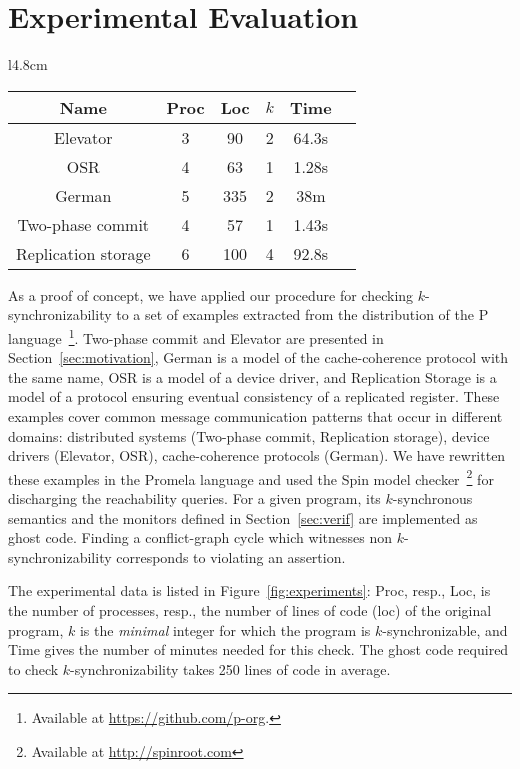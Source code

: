 \section{Experimental Evaluation}

\begin{wrapfigure}{l}{4.8cm}
\vspace{-7mm}
{\scriptsize
\begin{tabular}{|c|c|c|c|c|c|}
\hline
Name & Proc & Loc  & $k$ & Time \\
\hline
Elevator& 3 & 90  & 2 & 64.3s  \\
\hline
OSR & 4 & 63  & 1 & 1.28s \\
\hline
German & 5 & 335 & 2 & 38m \\
\hline
Two-phase commit &4 & 57 & 1 & 1.43s  \\
\hline
Replication storage & 6 & 100  & 4 & 92.8s \\
\hline
\end{tabular}
}
\caption{Experimental results.}
\label{fig:experiments}
\vspace{-7mm}
\end{wrapfigure}
As a proof of concept, we have applied our procedure for checking $k$-synchronizability to a set of examples extracted from the distribution of the P language~\footnote{Available at \url{https://github.com/p-org}.}. Two-phase commit and Elevator are presented in Section~\ref{sec:motivation}, German is a model of the cache-coherence protocol with the same name, OSR is a model of a device driver, and Replication Storage is a model of a protocol ensuring eventual consistency of a replicated register.
These examples cover common message communication patterns that occur in different domains: distributed systems (Two-phase commit, Replication storage), device drivers (Elevator, OSR), cache-coherence protocols (German). %
%
We have rewritten these examples in the Promela language and used the Spin model checker~\footnote{Available at \url{http://spinroot.com}} for discharging the reachability queries. For a given  program, its $k$-synchronous semantics and the monitors defined in Section~\ref{sec:verif} are implemented as ghost code. 
Finding a conflict-graph cycle which witnesses non $k$-synchronizability corresponds to violating an assertion. 

The experimental data is listed in Figure~\ref{fig:experiments}: Proc, resp., Loc, is the number of processes, resp., the number of lines of code (loc) of the original program, $k$ is the \emph{minimal} integer for which the program is $k$-synchronizable, and Time gives the number of minutes needed for this check. The ghost code required to check $k$-synchronizability takes 250 lines of code in average.
